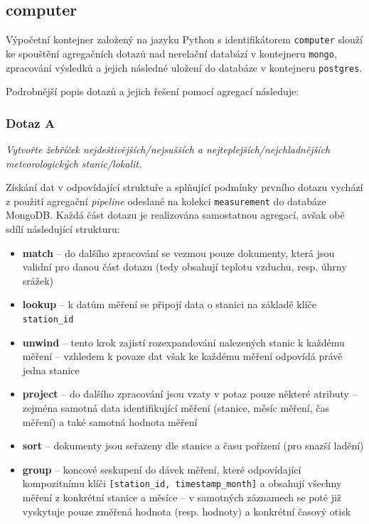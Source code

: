 \documentclass[10pt,a4paper,titlepage]{extarticle}
\begin{document}
    \subsection{computer}

    Výpočetní kontejner založený na jazyku Python s identifikátorem \texttt{computer} slouží ke spouštění agregačních
    dotazů nad nerelační databází v kontejneru \texttt{mongo}, zpracování výsledků a jejich následné uložení do databáze
    v kontejneru \texttt{postgres}.

    Podrobnější popis dotazů a jejich řešení pomocí agregací následuje:

    \subsubsection{Dotaz A}
    \emph{Vytvořte žebříček nejdeštivějších/nejsušších a nejteplejších/nejchladnějších meteorologických stanic/lokalit.}

    Získání dat v odpovídající struktuře a splňující podmínky prvního dotazu vychází z použití agregační \emph{pipeline}
    odeslané na kolekci \texttt{measurement} do databáze MongoDB. Každá část dotazu je realizována samostatnou
    agregací, avšak obě sdílí následující strukturu:
    \begin{itemize}
        \item \textbf{{\textdollar}match} -- do dalšího zpracování se vezmou pouze dokumenty, která jsou validní pro
        danou část dotazu (tedy obsahují teplotu vzduchu, resp. úhrny srážek)
        \item \textbf{{\textdollar}lookup} -- k datům měření se připojí data o stanici na základě klíče \texttt{station\_id}
        \item \textbf{{\textdollar}unwind} -- tento krok zajistí rozexpandování nalezených stanic k každému měření --
        vzhledem k povaze dat však ke každému měření odpovídá právě jedna stanice
        \item \textbf{{\textdollar}project} -- do dalšího zpracování jsou vzaty v potaz pouze některé
        atributy -- zejména samotná data identifikující měření (stanice, měsíc měření, čas měření) a také samotná
        hodnota měření
        \item \textbf{{\textdollar}sort} -- dokumenty jsou seřazeny dle stanice a času pořízení (pro snazší ladění)
        \item \textbf{{\textdollar}group} -- koncové seskupení do dávek měření, které odpovídající kompozitnímu klíči
        \texttt{[station\_id, timestamp\_month]} a obsahují všechny měření z konkrétní stanice a měsíce -- v
        samotných záznamech se poté již vyskytuje pouze změřená hodnota (resp. hodnoty) a konkrétní časový otisk
    \end{itemize}
\end{document}
